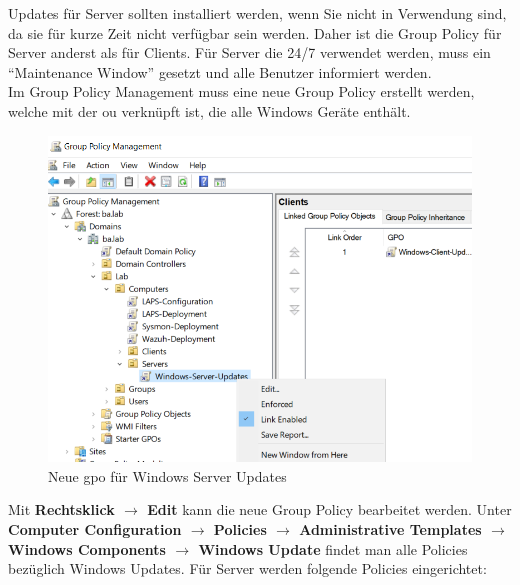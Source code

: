 Updates für Server sollten installiert werden, wenn Sie nicht in Verwendung sind, da sie für kurze Zeit nicht verfügbar sein werden.
Daher ist die Group Policy für Server anderst als für Clients.
Für Server die 24/7 verwendet werden, muss ein ``Maintenance Window'' gesetzt und alle Benutzer informiert werden.\\

Im Group Policy Management muss eine neue Group Policy erstellt werden, welche mit der \acrshort{ou} verknüpft ist, die alle Windows Geräte enthält.
\begin{figure}[H]
    \centering
    \includegraphics[width=0.7\linewidth]{../img/Updates/edit-gpo-server.png}
    \caption{Neue \acrshort{gpo} für Windows Server Updates}
\end{figure}

Mit \textbf{Rechtsklick $\rightarrow$ Edit} kann die neue Group Policy bearbeitet werden.
Unter \textbf{Computer Configuration $\rightarrow$ Policies $\rightarrow$ Administrative Templates $\rightarrow$ Windows Components $\rightarrow$ Windows Update} findet man alle Policies bezüglich Windows Updates.
Für Server werden folgende Policies eingerichtet:

